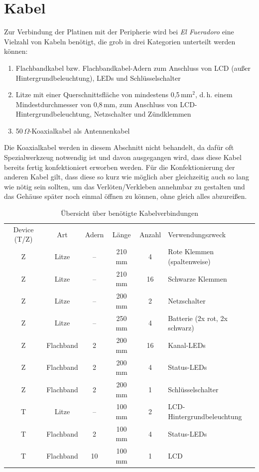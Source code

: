 \documentclass[pdftex, parskip, numbers=noenddot, toc=listof]{scrbook}
\newcommand{\anlage}{\emph{El Fueradoro}}
\begin{document}
	\section{Kabel}

	Zur Verbindung der Platinen mit der Peripherie wird bei {\anlage} eine Vielzahl von Kabeln benötigt, die grob in drei Kategorien unterteilt werden können:
	\begin{enumerate}
		\item  Flachbandkabel bzw. Flachbandkabel-Adern zum Anschluss von LCD (außer Hintergrundbeleuchtung), LEDs und Schlüsselschalter
		\item Litze mit einer Querschnittsfläche von mindestens 0,5\,mm$^2$, d.\,h. einem Mindestdurchmesser von 0,8\,mm, zum Anschluss von LCD-Hintergrundbeleuchtung, Netzschalter und
		      Zündklemmen
		\item 50\,$\Omega$-Koaxialkabel als Antennenkabel
	\end{enumerate}

	Die Koaxialkabel werden in diesem Abschnitt nicht behandelt, da dafür oft Spezialwerkzeug notwendig ist und davon ausgegangen wird, dass diese Kabel bereits fertig konfektioniert erworben werden. Für die Konfektionierung der anderen Kabel gilt, dass diese so kurz wie möglich aber gleichzeitig auch so lang wie nötig sein sollten, um das Verlöten/Verkleben annehmbar zu gestalten und das Gehäuse später noch einmal öffnen zu können, ohne gleich alles abzureißen.

	\begin{table}
		\centering
		\begin{tabularx}{\textwidth}{cccccX}
			\hline\hline
			Device (T/Z) & Art       & Adern & Länge & Anzahl & Verwendungszweck              \\
			Z            & Litze     & --    & 210 mm & 4      & Rote Klemmen (spaltenweise)   \\
			Z            & Litze     & --    & 210 mm & 16     & Schwarze Klemmen              \\
			Z            & Litze     & --    & 200 mm & 2      & Netzschalter                  \\
			Z            & Litze     & --    & 250 mm & 4      & Batterie (2x rot, 2x schwarz) \\
			Z            & Flachband & 2     & 200 mm & 16     & Kanal-LEDs                    \\
			Z            & Flachband & 2     & 200 mm & 4      & Status-LEDs                   \\
			Z            & Flachband & 2     & 200 mm & 1      & Schlüsselschalter            \\ \hline
			T            & Litze     & --    & 100 mm & 2      & LCD-Hintergrundbeleuchtung    \\
			T            & Flachband & 2     & 100 mm & 4      & Status-LEDs                   \\
			T            & Flachband & 10    & 100 mm & 1      & LCD                           \\ \hline\hline
		\end{tabularx}
		\caption{Übersicht über benötigte Kabelverbindungen}
		\label{tab:kabel}
	\end{table}
\end{document}
